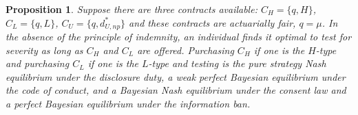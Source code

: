 \documentclass[nonatbib,preprint,12pt]{elsarticle}
\theoremstyle{plain}
\newtheorem{prop}[theorem]{Proposition}
\theoremstyle{definition}
\theoremstyle{plain}
\theoremstyle{TheoremNum}
\theoremstyle{CorollaryNum}
\theoremstyle{PropositionNum}
\theoremstyle{TheoremNum}
\begin{document}



\fi

\begin{prop}
Suppose there are three contracts available: $C_H = \{q, H\}$, $C_L = \{q, L\}$, $C_U = \{q, d_{U,np}^*\}$ and these contracts are actuarially fair, $q=\mu$. In the absence of the principle of indemnity, an individual finds it optimal to test for severity as long as $C_H$ and $C_L$ are offered. Purchasing $C_H$ if one is the $H$-type and purchasing $C_L$ if one is the $L$-type and testing is the pure strategy Nash equilibrium under the disclosure duty, a weak perfect Bayesian equilibrium under the code of conduct, and a Bayesian Nash equilibrium under the consent law and a perfect Bayesian equilibrium under the information ban.
\end{prop}
\end{document}
